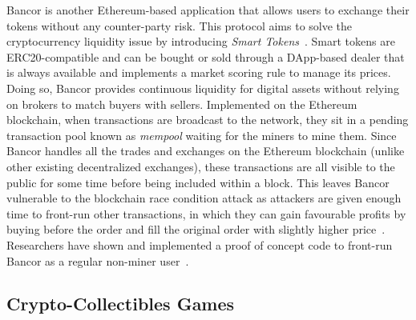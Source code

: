 
Bancor is another Ethereum-based application that allows users to exchange their tokens without any counter-party risk. This protocol aims to solve the cryptocurrency liquidity issue by introducing \textit{Smart Tokens}~\cite{hertzog2017bancor}. Smart tokens are ERC20-compatible and can be bought or sold through a DApp-based dealer that is always available and implements a market scoring rule to manage its prices. Doing so, Bancor provides continuous liquidity for digital assets without relying on brokers to match buyers with sellers. Implemented on the Ethereum blockchain, when transactions are broadcast to the network, they sit in a pending transaction pool known as \textit{mempool} waiting for the miners to mine them. Since Bancor handles all the trades and exchanges on the Ethereum blockchain (unlike other existing decentralized exchanges), these transactions are all visible to the public for some time before being included within a block. This leaves Bancor vulnerable to the blockchain race condition attack as attackers are given enough time to front-run other transactions, in which they can gain favourable profits by buying before the order and fill the original order with slightly higher price~\cite{BancorIs7:online}. Researchers have shown and implemented a proof of concept code to front-run Bancor as a regular non-miner user~\cite{NewTab13:online}.


\subsection{Crypto-Collectibles Games}\label{sec:cryptogames}

